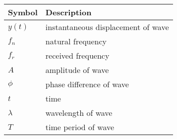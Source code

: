 \begin{tabular}{ | m{1.0cm} | m{4cm} | } 
  \hline
 Symbol & Description \\ 
 \hline
 $y(t)$ & instantaneous displacement of wave \\
 \hline
$f_n $& natural frequency \\
\hline
$f_r $& received frequency \\
\hline
$A$ & amplitude of wave \\ 
\hline
 $\phi $& phase difference of wave \\
\hline
$t $& time  \\
\hline
$\lambda $& wavelength of wave \\
\hline
$T $& time period of wave \\
\hline
\end{tabular}\\
\caption{}
\label{Table:1}